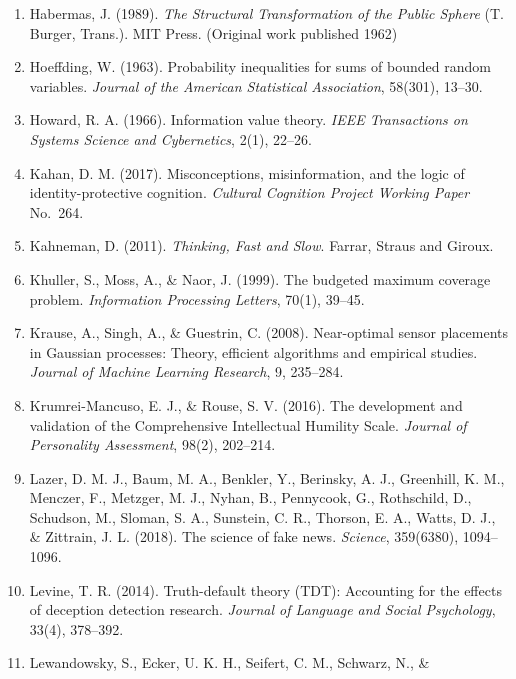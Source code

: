 \documentclass[
  11pt]{article}
\begin{document}
\begin{enumerate}
  Guess, A., Malhotra, N., Pan, J., Barberá, P., Allcott, H., Brown, T.,
  Dimmery, A., Moehler, D., Nyhan, B., Tucker, J. A., \& Bonneau, R.
  (2023). How do social media feed algorithms affect attitudes and
  behavior in an election campaign? \emph{Science}, 381(6656), 398--404.
\item
  Habermas, J. (1989). \emph{The Structural Transformation of the Public
  Sphere} (T. Burger, Trans.). MIT Press. (Original work published 1962)
\item
  Hoeffding, W. (1963). Probability inequalities for sums of bounded
  random variables. \emph{Journal of the American Statistical
  Association}, 58(301), 13--30.
\item
  Howard, R. A. (1966). Information value theory. \emph{IEEE
  Transactions on Systems Science and Cybernetics}, 2(1), 22--26.
\item
  Kahan, D. M. (2017). Misconceptions, misinformation, and the logic of
  identity-protective cognition. \emph{Cultural Cognition Project
  Working Paper} No.~264.
\item
  Kahneman, D. (2011). \emph{Thinking, Fast and Slow}. Farrar, Straus
  and Giroux.
\item
  Khuller, S., Moss, A., \& Naor, J. (1999). The budgeted maximum
  coverage problem. \emph{Information Processing Letters}, 70(1),
  39--45.
\item
  Krause, A., Singh, A., \& Guestrin, C. (2008). Near-optimal sensor
  placements in Gaussian processes: Theory, efficient algorithms and
  empirical studies. \emph{Journal of Machine Learning Research}, 9,
  235--284.
\item
  Krumrei-Mancuso, E. J., \& Rouse, S. V. (2016). The development and
  validation of the Comprehensive Intellectual Humility Scale.
  \emph{Journal of Personality Assessment}, 98(2), 202--214.
\item
  Lazer, D. M. J., Baum, M. A., Benkler, Y., Berinsky, A. J., Greenhill,
  K. M., Menczer, F., Metzger, M. J., Nyhan, B., Pennycook, G.,
  Rothschild, D., Schudson, M., Sloman, S. A., Sunstein, C. R., Thorson,
  E. A., Watts, D. J., \& Zittrain, J. L. (2018). The science of fake
  news. \emph{Science}, 359(6380), 1094--1096.
\item
  Levine, T. R. (2014). Truth-default theory (TDT): Accounting for the
  effects of deception detection research. \emph{Journal of Language and
  Social Psychology}, 33(4), 378--392.
\item
  Lewandowsky, S., Ecker, U. K. H., Seifert, C. M., Schwarz, N., \&

\end{enumerate}
\end{document}
